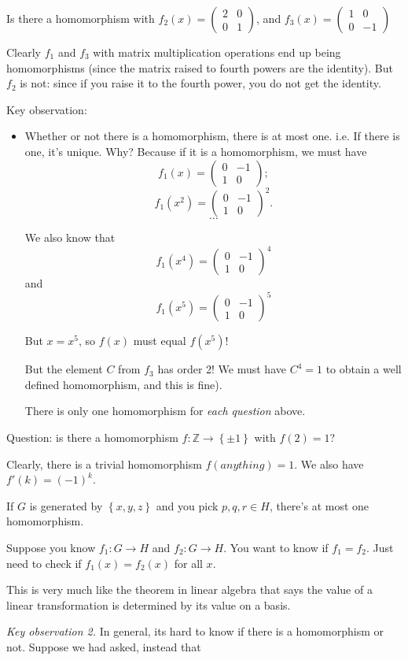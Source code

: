 \documentclass[12pt]{article}
\newcommand*{\mat}[1]{\begin{pmatrix}#1\end{pmatrix}}
\def\ZZ{\mathbb{Z}}
\newcommand*{\mat}[1]{\begin{pmatrix}#1\end{pmatrix}}
\begin{document}
Is there a homomorphism with $f_2(x) = \mat{2 & 0 \\ 0 & 1}$, and $f_3(x) = \mat{1 & 0 \\ 0 & -1}$

Clearly $f_1$ and $f_3$ with matrix multiplication operations end up being homomorphisms (since the matrix raised to fourth powers are the identity).  But $f_2$ is not: since if you raise it to the fourth power, you do not get the identity.

Key observation:
\begin{itemize}
  \item Whether or not there is a homomorphism, there is at most one.  i.e. If there is one, it's unique.  Why?  Because if it is a homomorphism, we must have
    \[
      f_1(x) = \mat{0 & -1 \\ 1 & 0};
    \]
    \[
      f_1(x^2) = \mat{0 & -1 \\ 1 & 0}^2.
    \]
    \[
    \dots
  \]

    We also know that
    \[
      f_1(x^4)= \mat{0 & -1 \\ 1 & 0}^4
    \]
    and
    \[
      f_1(x^5) = \mat{0 & -1 \\ 1 & 0}^5
    \] 

    But $x = x^5$, so $f(x)$ must equal $f(x^5)$!

  But the element $C$ from $f_3$ has order 2!  We must have $C^4 = 1$ to obtain a well defined homomorphism, and this is fine).

  There is only one homomorphism for {\it each question} above.

\end{itemize}

Question: is there a homomorphism $f: \ZZ \to \left\{ \pm 1 \right\}$ with $f(2) = 1$?

Clearly, there is a trivial homomorphism $f(anything) = 1$.  We also have $f'(k) =(-1)^{k}$.

If $G$ is generated by $\left\{ x, y, z \right\}$ and you pick $p, q, r \in H$, there's at most one homomorphism.

Suppose you know $f_1: G \to H$ and $f_2: G \to H$.  You want to  know if $f_1 = f_2$.  Just need to check if $f_1(x) = f_2(x)$ for all $x$.

This is very much like the theorem in linear algebra that says the value of a linear transformation is determined by its value on a basis.

{\it Key observation 2.} In general, its hard to know if there is a homomorphism or not.  Suppose we had asked, instead that
\end{document}
